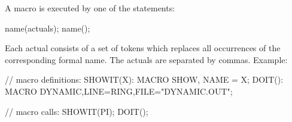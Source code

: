 A macro is executed by one of the statements:
\begin{example}
name(actuals);
name();
\end{example}
Each actual consists of a set of tokens which replaces all occurrences of
the corresponding formal name.
The actuals are separated by commas.
\noindent Example:
\begin{example}
// macro definitions:
SHOWIT(X): MACRO {
   SHOW, NAME = X;
}
DOIT(): MACRO {
   DYNAMIC,LINE=RING,FILE="DYNAMIC.OUT";
}

// macro calls:
SHOWIT(PI);
DOIT();
\end{example}


